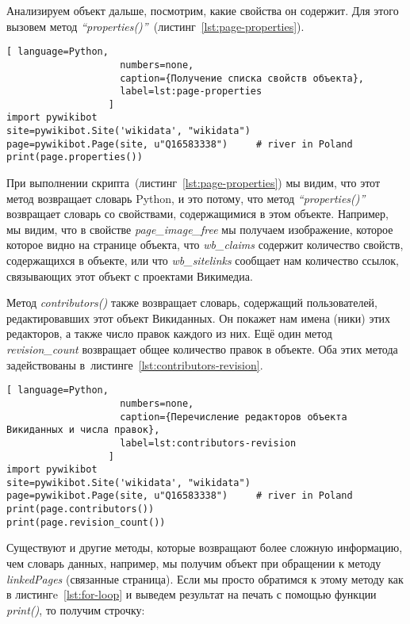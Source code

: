 Анализируем объект дальше, посмотрим, какие свойства он содержит. Для этого вызовем метод \textit{``properties()''}~(листинг~\ref{lst:page-properties}).

\begin{lstlisting}[ language=Python,
                    numbers=none,
                    caption={Получение списка свойств объекта},
                    label=lst:page-properties
                  ]
import pywikibot
site=pywikibot.Site('wikidata', "wikidata")
page=pywikibot.Page(site, u"Q16583338")     # river in Poland
print(page.properties())
\end{lstlisting}

При выполнении скрипта~(листинг~\ref{lst:page-properties}) мы видим, что этот метод возвращает словарь Python, и это потому, что метод \textit{``properties()''} возвращает словарь со свойствами, содержащимися в этом объекте. Например, мы видим, что в свойстве \textit{page\_image\_free} мы получаем изображение, которое которое видно на странице объекта, что \textit{wb\_claims} содержит количество свойств, содержащихся в объекте, или что \textit{wb\_sitelinks} сообщает нам количество ссылок, связывающих этот объект с проектами Викимедиа.

Метод \textit{contributors()} также возвращает словарь, содержащий пользователей, редактировавших этот объект Викиданных. Он покажет нам имена (ники) этих редакторов, а также число правок каждого из них. Ещё один метод \textit{revision\_count} возвращает общее количество правок в объекте. Оба этих метода задействованы в~листинге~\ref{lst:contributors-revision}.

\begin{lstlisting}[ language=Python,
                    numbers=none,
                    caption={Перечисление редакторов объекта Викиданных и числа правок},
                    label=lst:contributors-revision
                  ]
import pywikibot
site=pywikibot.Site('wikidata', "wikidata")
page=pywikibot.Page(site, u"Q16583338")     # river in Poland
print(page.contributors())
print(page.revision_count())
\end{lstlisting}

Существуют и другие методы, которые возвращают более сложную информацию, чем словарь данных, например, мы получим объект при обращении к методу \textit{linkedPages} (связанные страница). Если мы просто обратимся к этому методу как в листингe~\ref{lst:for-loop} и выведем результат на печать с помощью функции \textit{print()}, то получим строчку: 

